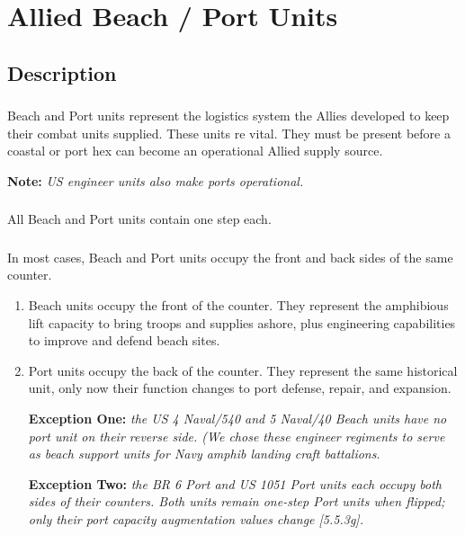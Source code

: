 \section{Allied Beach / Port Units}
\subsection{Description}
\subsubsection{}
Beach and Port units represent the logistics system the Allies developed to keep their combat units supplied. These units re vital. They must be present before a coastal or port hex can become an operational Allied supply source.

\textbf{Note:} \textit{US engineer units also make ports operational.}

\subsubsection{}
All Beach and Port units contain one step each.

\subsubsection{}
In most cases, Beach and Port units occupy the front and back sides of the same counter.

\begin{enumerate}[label=\alph*.]
    \item Beach units occupy the front of the counter. They represent the amphibious lift capacity to bring troops and supplies ashore, plus engineering capabilities to improve and defend beach sites.
    \item Port units occupy the back of the counter. They represent the same historical unit, only now their function changes to port defense, repair, and expansion.
    
    \textbf{Exception One:} \textit{the US 4 Naval/540 and 5 Naval/40 Beach units have no port unit on their reverse side. (We chose these engineer regiments to serve as beach support units for Navy amphib landing craft battalions}.
    
    \textbf{Exception Two:} \textit{the BR 6 Port and US 1051 Port units each occupy both sides of their counters. Both units remain one-step Port units when flipped; only their port capacity augmentation values change [5.5.3g].}
\end{enumerate}

